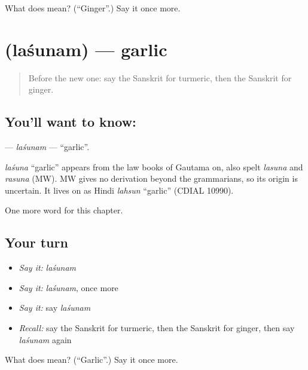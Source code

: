 \begin{tcolorbox}[breakable,colback=teal!4,colframe=teal!35!black,title={Before you move on}]
What does  mean? (\textquotedblleft{}Ginger\textquotedblright{}.) Say it once more.
\end{tcolorbox}
\section[\texorpdfstring{\sk{लशुनम्} (laśunam)}{लशुनम् (laśunam)}]{ (laśunam) — garlic}

\label{lesson:SA-C107-lasunam}



\begin{quote}
Before the new one: say the Sanskrit for turmeric, then the Sanskrit for ginger.
\end{quote}

\subsection*{You'll want to know: }
\textbf{} — \emph{laśunam} — \textquotedblleft{}garlic\textquotedblright{}.

\begin{cousinweb}
\emph{laśuna} \textquotedblleft{}garlic\textquotedblright{} appears from the law books of Gautama on, also spelt \emph{lasuna} and \emph{rasuna} (MW). MW gives no derivation beyond the grammarians, so its origin is uncertain. It lives on as Hindi \emph{lahsun} \textquotedblleft{}garlic\textquotedblright{} (CDIAL 10990).
\end{cousinweb}

\begin{grammarlens}[title={What you've built}]
One more word for this chapter.
\end{grammarlens}

\subsection*{Your turn}
\begin{itemize}
\raggedright
  \item \emph{Say it:} \emph{laśunam}
  \item \emph{Say it:} \emph{laśunam}, once more
  \item \emph{Say it:} say \emph{laśunam}
  \item \emph{Recall:} say the Sanskrit for turmeric, then the Sanskrit for ginger, then say \emph{laśunam} again
\end{itemize}

\begin{tcolorbox}[breakable,colback=teal!4,colframe=teal!35!black,title={Before you move on}]
What does  mean? (\textquotedblleft{}Garlic\textquotedblright{}.) Say it once more.
\end{tcolorbox}
